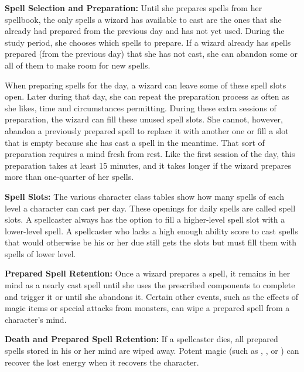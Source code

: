 \textbf{Spell Selection and Preparation:} Until she prepares spells from her spellbook, the only spells a wizard has available to cast are the ones that she already had prepared from the previous day and has not yet used. During the study period, she chooses which spells to prepare. If a wizard already has spells prepared (from the previous day) that she has not cast, she can abandon some or all of them to make room for new spells.

When preparing spells for the day, a wizard can leave some of these spell slots open. Later during that day, she can repeat the preparation process as often as she likes, time and circumstances permitting. During these extra sessions of preparation, the wizard can fill these unused spell slots. She cannot, however, abandon a previously prepared spell to replace it with another one or fill a slot that is empty because she has cast a spell in the meantime. That sort of preparation requires a mind fresh from rest. Like the first session of the day, this preparation takes at least 15 minutes, and it takes longer if the wizard prepares more than one-quarter of her spells.

\textbf{Spell Slots:} The various character class tables show how many spells of each level a character can cast per day. These openings for daily spells are called spell slots. A spellcaster always has the option to fill a higher-level spell slot with a lower-level spell. A spellcaster who lacks a high enough ability score to cast spells that would otherwise be his or her due still gets the slots but must fill them with spells of lower level.

\textbf{Prepared Spell Retention:} Once a wizard prepares a spell, it remains in her mind as a nearly cast spell until she uses the prescribed components to complete and trigger it or until she abandons it. Certain other events, such as the effects of magic items or special attacks from monsters, can wipe a prepared spell from a character's mind.

\textbf{Death and Prepared Spell Retention:} If a spellcaster dies, all prepared spells stored in his or her mind are wiped away. Potent magic (such as , , or ) can recover the lost energy when it recovers the character.